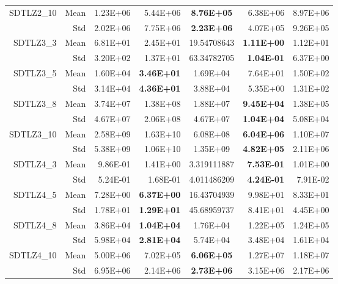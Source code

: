 \begin{table*}[htbp]
\begin{tabular}{rrrrrrr}
    \multirow{2}[0]{*}{SDTLZ2\_10} & Mean  & 1.23E+06 & 5.44E+06 & \multicolumn{1}{c}{\textbf{8.76E+05}} & 6.38E+06 & 8.97E+06 \\
          & Std   & 2.02E+06 & 7.75E+06 & \multicolumn{1}{c}{\textbf{2.23E+06}} & 4.07E+05 & 9.26E+05 \\
    \multirow{2}[0]{*}{SDTLZ3\_3} & Mean  & 6.81E+01 & 2.45E+01 & \multicolumn{1}{c}{19.54708643} & \textbf{1.11E+00} & 1.12E+01 \\
          & Std   & 3.20E+02 & 1.37E+01 & \multicolumn{1}{c}{63.34782705} & \textbf{1.04E-01} & 6.37E+00 \\
    \multirow{2}[0]{*}{SDTLZ3\_5} & Mean  & 1.60E+04 & \textbf{3.46E+01} & \multicolumn{1}{c}{1.69E+04} & 7.64E+01 & 1.50E+02 \\
          & Std   & 3.14E+04 & \textbf{4.36E+01} & \multicolumn{1}{c}{3.88E+04} & 5.35E+00 & 1.31E+02 \\
    \multirow{2}[0]{*}{SDTLZ3\_8} & Mean  & 3.74E+07 & 1.38E+08 & \multicolumn{1}{c}{1.88E+07} & \textbf{9.45E+04} & 1.38E+05 \\
          & Std   & 4.67E+07 & 2.06E+08 & \multicolumn{1}{c}{4.67E+07} & \textbf{1.04E+04} & 5.08E+04 \\
    \multirow{2}[0]{*}{SDTLZ3\_10} & Mean  & 2.58E+09 & 1.63E+10 & \multicolumn{1}{c}{6.08E+08} & \textbf{6.04E+06} & 1.10E+07 \\
          & Std   & 5.38E+09 & 1.06E+10 & \multicolumn{1}{c}{1.35E+09} & \textbf{4.82E+05} & 2.11E+06 \\
    \multirow{2}[0]{*}{SDTLZ4\_3} & Mean  & 9.86E-01 & 1.41E+00 & \multicolumn{1}{c}{3.319111887} & \textbf{7.53E-01} & 1.01E+00 \\
          & Std   & 5.24E-01 & 1.68E-01 & \multicolumn{1}{c}{4.011486209} & \textbf{4.24E-01} & 7.91E-02 \\
    \multirow{2}[0]{*}{SDTLZ4\_5} & Mean  & 7.28E+00 & \textbf{6.37E+00} & \multicolumn{1}{c}{16.43704939} & 9.98E+01 & 8.33E+01 \\
          & Std   & 1.78E+01 & \textbf{1.29E+01} & \multicolumn{1}{c}{45.68959737} & 8.41E+01 & 4.45E+00 \\
    \multirow{2}[0]{*}{SDTLZ4\_8} & Mean  & 3.86E+04 & \textbf{1.04E+04} & \multicolumn{1}{c}{1.76E+04} & 1.22E+05 & 1.24E+05 \\
          & Std   & 5.98E+04 & \textbf{2.81E+04} & \multicolumn{1}{c}{5.74E+04} & 3.48E+04 & 1.61E+04 \\
    \multirow{2}[0]{*}{SDTLZ4\_10} & Mean  & 5.00E+06 & 7.02E+05 & \multicolumn{1}{c}{\textbf{6.06E+05}} & 1.27E+07 & 1.18E+07 \\
          & Std   & 6.95E+06 & 2.14E+06 & \multicolumn{1}{c}{\textbf{2.73E+06}} & 3.15E+06 & 2.17E+06 \\
    \bottomrule
    \end{tabular}%
  \label{tab:SDTLZSP}%
\end{table*}%
